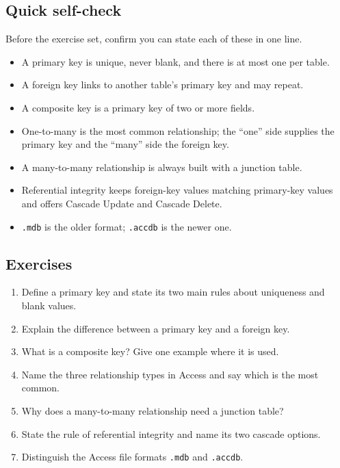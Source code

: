 \subsection*{Quick self-check}
Before the exercise set, confirm you can state each of these in one line.
\begin{itemize}
  \item A primary key is unique, never blank, and there is at most one per
    table.
  \item A foreign key links to another table's primary key and may repeat.
  \item A composite key is a primary key of two or more fields.
  \item One-to-many is the most common relationship; the ``one'' side supplies
    the primary key and the ``many'' side the foreign key.
  \item A many-to-many relationship is always built with a junction table.
  \item Referential integrity keeps foreign-key values matching primary-key
    values and offers Cascade Update and Cascade Delete.
  \item \texttt{.mdb} is the older format; \texttt{.accdb} is the newer one.
\end{itemize}

\subsection*{Exercises}
\begin{enumerate}[label=\arabic*.]
  \item Define a primary key and state its two main rules about uniqueness and
    blank values.
  \item Explain the difference between a primary key and a foreign key.
  \item What is a composite key? Give one example where it is used.
  \item Name the three relationship types in Access and say which is the most
    common.
  \item Why does a many-to-many relationship need a junction table?
  \item State the rule of referential integrity and name its two cascade
    options.
  \item Distinguish the Access file formats \texttt{.mdb} and \texttt{.accdb}.
\end{enumerate}

